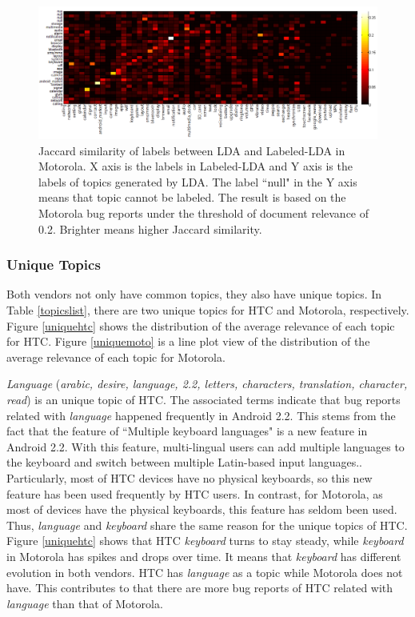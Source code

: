 \documentclass[10pt, conference, compsocconf]{IEEEtran}
\begin{document}
\begin{figure}[htb]
\centering
\includegraphics[width=1\textwidth]{motosim.png}
\caption{Jaccard similarity of labels between LDA and Labeled-LDA in Motorola. X axis is the labels in Labeled-LDA and Y axis is the labels of topics generated by LDA. The label ``null" in the Y axis means that topic cannot be labeled. The result is based on the Motorola bug reports under the threshold of document relevance of 0.2. Brighter means higher Jaccard similarity.}
\label{similaritymoto}
\end{figure}


\subsubsection{Unique Topics}
Both vendors not only have common topics, they also have unique topics. In Table \ref{topicslist}, there are two unique topics for HTC and Motorola, respectively. Figure \ref{uniquehtc} shows the distribution of the average relevance of each topic for HTC. Figure \ref{uniquemoto} is a line plot view of the distribution of the average relevance of each topic for Motorola.

\textit{Language} (\textit{arabic, desire, language, 2.2, letters, characters, translation, character, read}) is an unique topic of HTC. The associated terms indicate that bug reports related with \textit{language} happened frequently in Android 2.2. This stems from the fact that the feature of ``Multiple keyboard languages" is a new feature in Android 2.2. With this feature, multi-lingual users can add multiple languages to the keyboard and switch between multiple Latin-based input languages.\cite{androidwebsite}. Particularly, most of HTC devices have no physical keyboards, so this new feature has been used frequently by HTC users. In contrast, for Motorola, as most of devices have the physical keyboards, this feature has seldom been used. Thus, \textit{language} and \textit{keyboard} share the same reason for the unique topics of HTC. Figure \ref{uniquehtc} shows that HTC \textit{keyboard} turns to stay steady, while \textit{keyboard} in Motorola has spikes and drops over time. It means that \textit{keyboard} has different evolution in both vendors. HTC has \textit{language} as a topic while Motorola does not have. This contributes to that there are more bug reports of HTC related with \textit{language} than that of Motorola.
\end{document}
